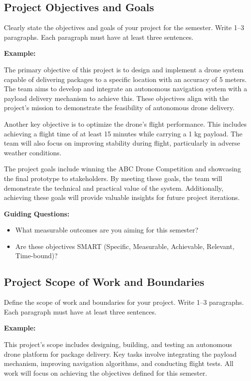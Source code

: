 \subsection{Project Objectives and Goals}
Clearly state the objectives and goals of your project for the semester. Write 1–3 paragraphs. Each paragraph must have at least three sentences.

\textbf{Example:}

The primary objective of this project is to design and implement a drone system capable of delivering packages to a specific location with an accuracy of 5 meters. The team aims to develop and integrate an autonomous navigation system with a payload delivery mechanism to achieve this. These objectives align with the project's mission to demonstrate the feasibility of autonomous drone delivery.

Another key objective is to optimize the drone's flight performance. This includes achieving a flight time of at least 15 minutes while carrying a 1 kg payload. The team will also focus on improving stability during flight, particularly in adverse weather conditions.

The project goals include winning the ABC Drone Competition and showcasing the final prototype to stakeholders. By meeting these goals, the team will demonstrate the technical and practical value of the system. Additionally, achieving these goals will provide valuable insights for future project iterations.

\textbf{Guiding Questions:}
\begin{itemize}
    \item What measurable outcomes are you aiming for this semester?
    \item Are these objectives SMART (Specific, Measurable, Achievable, Relevant, Time-bound)?
\end{itemize}

\subsection{Project Scope of Work and Boundaries}
Define the scope of work and boundaries for your project. Write 1–3 paragraphs. Each paragraph must have at least three sentences.

\textbf{Example:}

This project's scope includes designing, building, and testing an autonomous drone platform for package delivery. Key tasks involve integrating the payload mechanism, improving navigation algorithms, and conducting flight tests. All work will focus on achieving the objectives defined for this semester.

